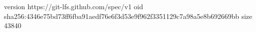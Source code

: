 version https://git-lfs.github.com/spec/v1
oid sha256:4346e75bd73ff6fba91aedf76e6f3d53e9f962f3351129c7a98a5e8b692669bb
size 43840
